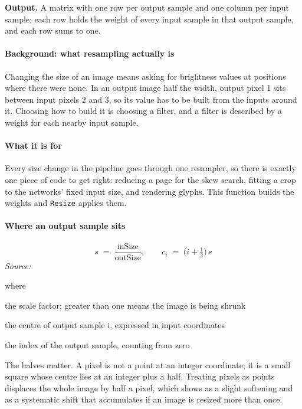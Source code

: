 \noindent\textbf{Output.} A matrix with one row per output sample and one column per input sample; each row holds the weight of every input sample in that output sample, and each row sums to one.


\paragraph{Background: what resampling actually is}
Changing the size of an image means asking for brightness values at positions where there were none. In an output image half the width, output pixel 1 sits between input pixels 2 and 3, so its value has to be built from the inputs around it. Choosing how to build it is choosing a filter, and a filter is described by a weight for each nearby input sample.


\paragraph{What it is for}
Every size change in the pipeline goes through one resampler, so there is exactly one piece of code to get right: reducing a page for the skew search, fitting a crop to the networks' fixed input size, and rendering glyphs. This function builds the weights and \texttt{Resize} applies them.


\paragraph{Where an output sample sits}

\begin{equation}
s \;=\; \frac{\mathrm{inSize}}{\mathrm{outSize}}, \qquad c_i \;=\; \big(i + \tfrac{1}{2}\big)\, s
\end{equation}
\noindent\emph{Source: }\cite{wolberg1990}


\noindent where
\begin{description}[leftmargin=2.4em,style=nextline,font=\normalfont\ttfamily]\setlength\itemsep{1pt}
  \item[{$s$}] \normalfont the scale factor; greater than one means the image is being shrunk
  \item[{$c_i$}] \normalfont the centre of output sample i, expressed in input coordinates
  \item[{$i$}] \normalfont the index of the output sample, counting from zero
\end{description}
The halves matter. A pixel is not a point at an integer coordinate; it is a small square whose centre lies at an integer plus a half. Treating pixels as points displaces the whole image by half a pixel, which shows as a slight softening and as a systematic shift that accumulates if an image is resized more than once.



